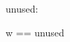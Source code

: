 \documentclass{article}
\begin{document}
\begin{zdirectives}
\end{zdirectives}

\begin{gendef}[X]
  unused: \nat
\end{gendef}
\begin{axdef}
  w == unused
\end{axdef}
\end{document}
